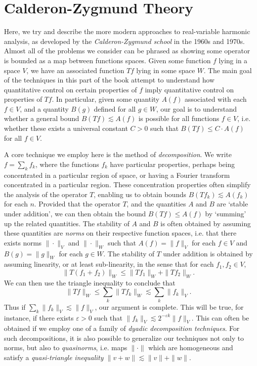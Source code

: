 
\part{Calderon-Zygmund Theory}

Here, we try and describe the more modern approaches to real-variable harmonic analysis, as developed by the \emph{Calderon-Zygmund school} in the 1960s and 1970s. Almost all of the problems we consider can be phrased as showing some operator is bounded as a map between functions spaces. Given some function $f$ lying in a space $V$, we have an associated function $Tf$ lying in some space $W$. The main goal of the techniques in this part of the book attempt to understand how quantitative control on certain properties of $f$ imply quantitative control on properties of $Tf$. In particular, given some quantity $A(f)$ associated with each $f \in V$, and a quantity $B(g)$ defined for all $g \in W$, our goal is to understand whether a general bound $B(Tf) \lesssim A(f)$ is possible for all functions $f \in V$, i.e. whether these exists a universal constant $C > 0$ such that $B(Tf) \leq C \cdot A(f)$ for all $f \in V$.

A core technique we employ here is the method of \emph{decomposition}. We write $f = \sum_k f_k$, where the functions $f_k$ have particular properties, perhaps being concentrated in a particular region of space, or having a Fourier transform concentrated in a particular region. These concentration properties often simplify the analysis of the operator $T$, enabling us to obtain bounds $B(Tf_k) \lesssim A(f_k)$ for each $n$. Provided that the operator $T$, and the quantities $A$ and $B$ are `stable under addition', we can then obtain the bound $B(Tf) \leq A(f)$ by `summing' up the related quantities. The stability of $A$ and $B$ is often obtained by assuming these quantities are \emph{norms} on their respective function spaces, i.e. that there exists norms $\| \cdot \|_V$ and $\| \cdot \|_W$ such that $A(f) = \| f \|_V$ for each $f \in V$ and $B(g) = \| g \|_W$ for each $g \in W$. The stability of $T$ under addition is obtained by assuming linearity, or at least sub-linearity, in the sense that for each $f_1, f_2 \in V$,
%
\[ \| T(f_1 + f_2) \|_W \leq \| T f_1 \|_W + \| Tf_2 \|_W. \]
%
We can then use the triangle inequality to conclude that
%
\[ \| Tf \|_W \leq \sum_k \| Tf_k \|_W \lesssim \sum_k \| f_k \|_V. \]
%
Thus if $\sum_k \| f_k \|_V \lesssim \| f \|_V$, our argument is complete. This will be true, for instance, if there exists $\varepsilon > 0$ such that $\| f_k \|_V \lesssim 2^{- \varepsilon k} \| f \|_V$. This can often be obtained if we employ one of a family of \emph{dyadic decomposition techniques}. For such decompositions, it is also possible to generalize our techniques not only to norms, but also to \emph{quasinorms}, i.e. maps $\| \cdot \|$ which are homogeneous and satisfy a \emph{quasi-triangle inequality} $\| v + w \| \lesssim \| v \| + \| w \|$.

